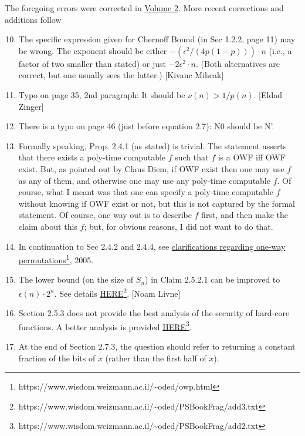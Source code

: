 \documentclass[10pt,a4paper]{article}
\begin{document}
The foregoing errors were corrected in \href{https://www.wisdom.weizmann.ac.il/~oded/foc-vol2.html}{Volume 2}. More recent corrections and additions follow
\begin{enumerate}
	\setcounter{enumi}{9}
	\item The specific expression given for Chernoff Bound (in Sec 1.2.2, page 11) may be wrong. The exponent should be either $-(\epsilon^2/(4p(1-p)))\cdot n$ (i.e., a factor of two smaller than stated) or just $-2\epsilon^2\cdot n$. (Both alternatives are correct, but one usually sees the latter.) [Kivanc Mihcak]
	\item Typo on page 35, 2nd paragraph: It should be $\nu(n) > 1/p(n)$. [Eldad Zinger]
	\item There is a typo on page 46 (just before equation 2.7): N0 should be N'.
	\item Formally speaking, Prop. 2.4.1 (as stated) is trivial. The statement asserts that there exists a poly-time computable $f$ such that $f$ is a OWF iff OWF exist. But, as pointed out by Claus Diem, if OWF exist then one may use $f$ as any of them, and otherwise one may use any poly-time computable $f$. Of course, what I meant was that one can specify a poly-time computable $f$ without knowing if OWF exist or not, but this is not captured by the formal statement. Of course, one way out is to describe $f$ first, and then make the claim about this $f$; but, for obvious reasons, I did not want to do that.
	\item In continuation to Sec 2.4.2 and 2.4.4, see \href{https://www.wisdom.weizmann.ac.il/~oded/owp.html}{clarifications regarding one-way permutations}\footnote{https://www.wisdom.weizmann.ac.il/\textasciitilde oded/owp.html}, 2005.
	\item The lower bound (on the size of $S_n$) in Claim 2.5.2.1 can be improved to $\epsilon(n)\cdot 2^n$. See details \href{https://www.wisdom.weizmann.ac.il/~oded/PSBookFrag/add3.txt}{HERE}\footnote{https://www.wisdom.weizmann.ac.il/\textasciitilde oded/PSBookFrag/add3.txt}. [Noam Livne]
	\item Section 2.5.3 does not provide the best analysis of the security of hard-core functions. A better analysis is provided \href{https://www.wisdom.weizmann.ac.il/~oded/PSBookFrag/add2.txt}{HERE}\footnote{https://www.wisdom.weizmann.ac.il/\textasciitilde oded/PSBookFrag/add2.txt}.
	\item At the end of Section 2.7.3, the question should refer to returning a constant fraction of the bits of $x$ (rather than the first half of $x$).

\end{enumerate}
\end{document}
